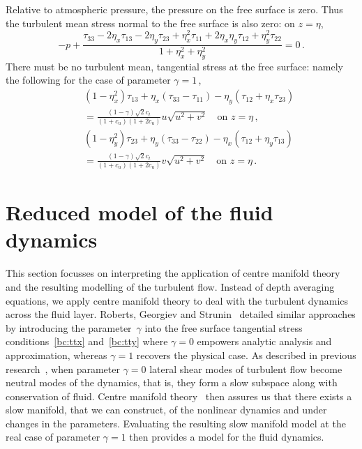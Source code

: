 \documentclass[twocolumn]{afmc_art}
\begin{document}
Relative to atmospheric pressure, the pressure on the free surface is zero. 
Thus the turbulent mean stress normal to the free surface is also zero: on $z=\eta$,
\begin{equation}
    -p+\frac{\tau_{33} -2\eta_x\tau_{13} -2\eta_y\tau_{23}
    +\eta_x^2\tau_{11} +2\eta_x\eta_y\tau_{12}+\eta_y^2\tau_{22}}
    {1+\eta_x^2+\eta_y^2}
     =0\,.
    \label{bc:ttz}
\end{equation}
There must be no turbulent mean, tangential stress at the free surface: namely the following for the case of parameter $\gamma=1$\,,
\begin{eqnarray}&&
    (1-\eta_x^2)\tau_{13}+\eta_x(\tau_{33}-\tau_{11})
    -\eta_y(\tau_{12}+\eta_x\tau_{23})
    \nonumber\\&&{}
    = \frac{(1-\gamma)\sqrt2c_t}{(1+c_u)(1+2c_u)} u\sqrt{u^2+v^2}
    \quad\text{on } z=\eta\,,
    \label{bc:ttx}
    \\&&
    (1-\eta_y^2)\tau_{23}+\eta_y(\tau_{33}-\tau_{22})
    -\eta_x(\tau_{12}+\eta_y\tau_{13})
    \nonumber\\&&{}
    = \frac{(1-\gamma)\sqrt2c_t}{(1+c_u)(1+2c_u)} v\sqrt{u^2+v^2}
    \quad\text{on } z=\eta\,.
    \label{bc:tty}
\end{eqnarray}


\section{Reduced model of the fluid dynamics}

This section focusses on interpreting the application of centre manifold theory and the resulting modelling of the turbulent flow.
Instead of depth averaging equations, we apply centre manifold theory to deal with the turbulent dynamics across the fluid layer. 
Roberts, Georgiev and Strunin~\cite{Roberts2008, Georgiev2008} detailed similar approaches by introducing the parameter~$\gamma$ into the free surface tangential stress conditions~\eqref{bc:ttx} and~\eqref{bc:tty} where $\gamma=0$ empowers analytic analysis and approximation, whereas $\gamma=1$ recovers the physical case. 
As described in previous research~\cite{Roberts2008, Georgiev2008}, when parameter \(\gamma=0\) lateral shear modes of turbulent flow become neutral modes of the dynamics, that is, they form a slow subspace along with conservation of fluid.
Centre manifold theory~\cite[e.g.]{Roberts1988} then assures us that there exists a slow manifold, that we can construct, of the nonlinear dynamics and under changes in the parameters.
Evaluating the resulting slow manifold model at the real case of parameter \(\gamma=1\) then provides a model for the fluid dynamics.
 
\end{document}
